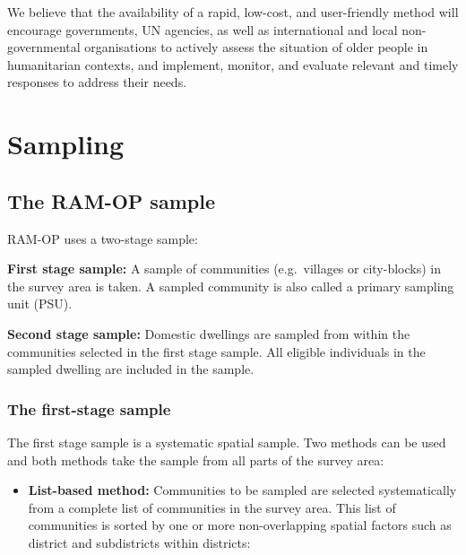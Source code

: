 \documentclass[12pt,a4paper]{book}
\providecommand{\tightlist}{%
  \setlength{\itemsep}{0pt}\setlength{\parskip}{0pt}}
\begin{document}
We believe that the availability of a rapid, low-cost, and user-friendly method will encourage governments, UN agencies, as well as international and local non-governmental organisations to actively assess the situation of older people in humanitarian contexts, and implement, monitor, and evaluate relevant and timely responses to address their needs.

\hypertarget{sampling}{%
\chapter{Sampling}\label{sampling}}

\hypertarget{the-ram-op-sample}{%
\section{The RAM-OP sample}\label{the-ram-op-sample}}

RAM-OP uses a two-stage sample:

\textbf{First stage sample:} A sample of communities (e.g.~villages or city-blocks) in the survey area is
taken. A sampled community is also called a primary sampling unit (PSU).

\textbf{Second stage sample:} Domestic dwellings are sampled from within the communities selected in the
first stage sample. All eligible individuals in the sampled dwelling are included in the sample.

\hypertarget{the-first-stage-sample}{%
\subsection{The first-stage sample}\label{the-first-stage-sample}}

The first stage sample is a systematic spatial sample. Two methods can be used and both methods take the sample from all parts of the survey area:

\begin{itemize}
\tightlist
\item
  \textbf{List-based method:} Communities to be sampled are selected systematically from a complete list of communities in the survey area. This list of communities is sorted by one or more non-overlapping spatial factors such as district and subdistricts within districts:
\end{itemize}
\end{document}
